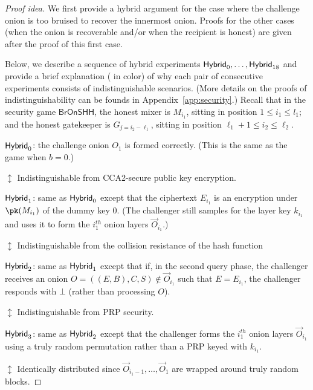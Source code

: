 \documentclass[runningheads,a4paper]{llncs}
\begin{document}
\begin{proof}[Proof idea]
We first provide a hybrid argument for the case where the challenge onion is too bruised to recover the innermost onion. Proofs for the other cases (when the onion is recoverable and/or when the recipient is honest) are given after the proof of this first case. %

Below, we describe a sequence of hybrid experiments $\mathsf{Hybrid}_{0}, \dots, \mathsf{Hybrid}_{18}$ and provide a brief explanation ({\color{hybrid} in color}) of why each pair of consecutive experiments consists of indistinguishable scenarios. (More details on the proofs of indistinguishability can be founds in Appendix~\ref{app:security}.)
Recall that in the security game $\mathsf{BrOnSHH}$, the honest mixer is $M_{i_1}$, sitting in position $1 \le i_1 \le l_1$; and the honest gatekeeper is $G_{j=i_2-\ell_1}$, sitting in position $\ell_1+1 \le i_2 \le \ell_2$. %


\medskip
\noindent $\mathsf{Hybrid}_{0}$: the challenge onion $O_1$ is formed correctly. (This is the same as the game when $b=0$.)  

    \textcolor{hybrid}{$\updownarrow$ Indistinguishable from CCA2-secure public key encryption.}

\noindent $\mathsf{Hybrid}_{1}$: same as $\mathsf{Hybrid}_{0}$ except that the ciphertext $E_{i_1}$ is an encryption under $\pk(M_{i_1})$ of the dummy key $0$. (The challenger still samples for the layer key $k_{i_1}$ and uses it to form the $i_1^\mathit{th}$ onion layers $\vec{O}_{i_1}$.) 

    \textcolor{hybrid}{$\updownarrow$ Indistinguishable from the collision resistance of the hash function}

\noindent $\mathsf{Hybrid}_{2}$: same as $\mathsf{Hybrid}_{1}$ except that if, in the second query phase, the challenger receives an onion $O = ((E, B), C, S) \not\in \vec{O}_{i_1}$ such that $E=E_{i_1}$, the challenger responds with $\bot$ (rather than processing $O$). 

    \textcolor{hybrid}{$\updownarrow$ Indistinguishable from PRP security.}

\noindent $\mathsf{Hybrid}_{3}$: same as $\mathsf{Hybrid}_{2}$ except that the challenger forms the $i_1^\mathit{th}$ onion layers $\vec{O}_{i_1}$ using a truly random permutation rather than a PRP keyed with $k_{i_1}$. 

    \textcolor{hybrid}{$\updownarrow$ Identically distributed since $\vec{O}_{i_1-1}, \dots, \vec{O}_1$ are wrapped around truly random blocks.}


\end{proof}
\end{document}
